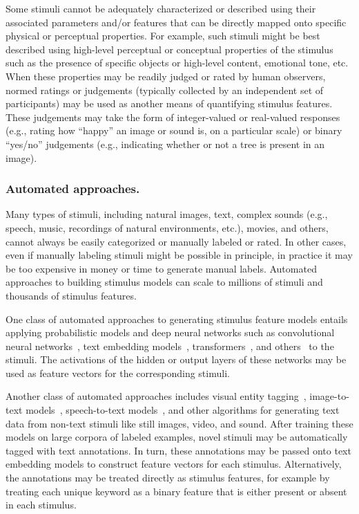 \documentclass[runningheads]{llncs}
\begin{document}
Some stimuli cannot be adequately characterized or described using
their associated parameters and/or features that can be directly
mapped onto specific physical or perceptual properties.  For example,
such stimuli might be best described using high-level perceptual or
conceptual properties of the stimulus such as the presence of specific
objects or high-level content, emotional tone, etc.  When these
properties may be readily judged or rated by human observers, normed
ratings or judgements (typically collected by an independent set of
participants) may be used as another means of quantifying stimulus
features.  These judgements may take the form of integer-valued or
real-valued responses (e.g., rating how ``happy'' an image or sound
is, on a particular scale) or binary ``yes/no'' judgements (e.g.,
indicating whether or not a tree is present in an image).


\subsubsection{Automated approaches.}
Many types of stimuli, including natural images, text, complex sounds
(e.g., speech, music, recordings of natural environments, etc.),
movies, and others, cannot always be easily categorized or manually
labeled or rated.  In other cases, even if manually labeling stimuli
might be possible in principle, in practice it may be too expensive in
money or time to generate manual labels.  Automated approaches to
building stimulus models can scale to millions of stimuli and
thousands of stimulus features.

One class of automated approaches to generating stimulus feature
models entails applying probabilistic models and deep neural networks
such as convolutional neural networks~\citep{LeCuBeng95, KrizEtal12},
text embedding models~\citep{DeerEtal90, LandDuma97, NelsEtal04,
  SteyEtal04, BleiEtal03,
  BengEtal03, BrowEtal92, MnihHint09, MikoEtal13a, MikoEtal13b,
  PennEtal14, PeteEtal18, KiroEtal15, CerEtal18, ConnEtal18,
  WietKiel19}, transformers~\citep{DevlEtal18, BrowEtal20,
  RadfEtal19}, and others~\citep{KharEtal21} to the stimuli.  The
activations of the hidden or output layers of these networks may be
used as feature vectors for the corresponding stimuli.

Another class of automated approaches includes visual entity
tagging~\citep{ChenEtal13b}, image-to-text models~\citep{StonEtal18,
  BaboEtal11, deAnEtal18}, speech-to-text models~\citep{FuruEtal04,
  JoneEtal03, ZimaEtal18, WilpEtal90}, and other algorithms for
generating text data from non-text stimuli like still images, video,
and sound.  After training these models on large corpora of labeled
examples, novel stimuli may be automatically tagged with text
annotations.  In turn, these annotations may be passed onto text
embedding models to construct feature vectors for each stimulus.
Alternatively, the annotations may be treated directly as stimulus
features, for example by treating each unique keyword as a binary
feature that is either present or absent in each stimulus.
\end{document}
